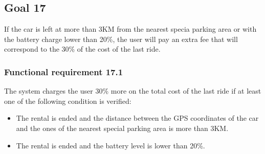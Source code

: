 \subsection{Goal 17}
If the car is left at more than 3KM from the nearest specia parking area or with the battery charge lower than 20\%, the user will pay an extra fee that will correspond to the 30\% of the cost of the last ride.

\setcounter{secnumdepth}{3}
\subsubsection{Functional requirement 17.1}
The system charges the user 30\% more on the total cost of the last ride if at least one of the following condition is verified:
\begin{itemize}
	\item The rental is ended and the distance between the GPS coordinates of the car and the ones of the nearest special parking area is more than 3KM.
	\item The rental is ended and the battery level is lower than 20\%.
\end{itemize}
